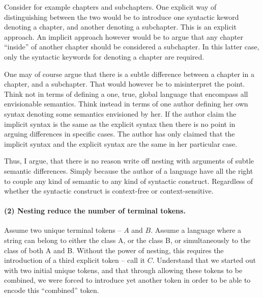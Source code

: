 \documentclass{scrreprt}
\begin{document}
Consider for example chapters and subchapters. One explicit way of distinguishing between the two would be to introduce one syntactic keword denoting a chapter, and another denoting a subchapter. This is an explicit approach. An implicit approach however would be to argue that any chapter ``inside'' of another chapter should be considered a subchapter. In this latter case, only the syntactic keywords for denoting a chapter are required.

One may of course argue that there is a subtle difference between a chapter in a chapter, and a subchapter. That would however be to misinterpret the point. Think not in terms of defining a one, true, global language that encompass all envisionable semantics. Think instead in terms of one author defining her own syntax denoting some semantics envisioned by her. If the author claim the implicit syntax is the same as the explicit syntax then there is no point in arguing differences in specific cases. The author has only claimed that the implicit syntax and the explicit syntax are the same in her particular case.

Thus, I argue, that there is no reason write off nesting with arguments of subtle semantic differences. Simply because the author of a language have all the right to couple any kind of semantic to any kind of syntactic construct. Regardless of whether the syntactic construct is context-free or context-sensitive.









\paragraph{(2) Nesting reduce the number of terminal tokens.}

Assume two unique terminal tokens -- \(A\) and \(B\). Assume a language where a string can belong to either the class A, or the class B, or simultaneously to the class of both A and B. Without the power of nesting, this requires the introduction of a third explicit token -- call it \(C\). Understand that we started out with two initial unique tokens, and that through allowing these tokens to be combined, we were forced to introduce yet another token in order to be able to encode this ``combined'' token.
\end{document}
